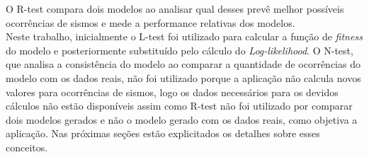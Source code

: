 O R-test compara dois modelos ao analisar qual desses prevê melhor possíveis ocorrências de sismos e mede a performance relativas dos modelos.\\ %

Neste trabalho, inicialmente o L-test foi utilizado para calcular a função de {\it fitness} do modelo e posteriormente substituído pelo cálculo do {\it Log-likelihood}. O N-test, que analisa a consistência do modelo ao comparar a quantidade de ocorrências do modelo com os dados reais, não foi utilizado porque a aplicação não calcula novos valores para ocorrências de sismos, logo os dados necessários para os devidos cálculos não estão disponíveis assim como R-test não foi utilizado por comparar dois modelos gerados e não o modelo gerado com os dados reais, como objetiva a aplicação. Nas próximas seções estão explicitados os detalhes sobre esses conceitos.